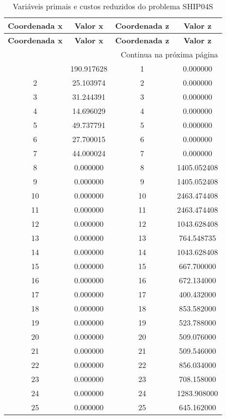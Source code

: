 \documentclass[12pt]{article}
\begin{document}
\begin{longtable}{@{}cccc@{}}
\caption{Variáveis primais e custos reduzidos do problema SHIP04S} \\
\toprule
\textbf{Coordenada x} & \textbf{Valor x} & \textbf{Coordenada z} & \textbf{Valor z} \\
\midrule
\endfirsthead

\toprule
\textbf{Coordenada x} & \textbf{Valor x} & \textbf{Coordenada z} & \textbf{Valor z} \\
\midrule
\endhead

\midrule \multicolumn{4}{r}{{Continua na próxima página}} \\ \midrule
\endfoot

\bottomrule
\endlastfoot
1 & 190.917628 & 1 & 0.000000 \\
2 & 25.103974 & 2 & 0.000000 \\
3 & 31.244391 & 3 & 0.000000 \\
4 & 14.696029 & 4 & 0.000000 \\
5 & 49.737791 & 5 & 0.000000 \\
6 & 27.700015 & 6 & 0.000000 \\
7 & 44.000024 & 7 & 0.000000 \\
8 & 0.000000 & 8 & 1405.052408 \\
9 & 0.000000 & 9 & 1405.052408 \\
10 & 0.000000 & 10 & 2463.474408 \\
11 & 0.000000 & 11 & 2463.474408 \\
12 & 0.000000 & 12 & 1043.628408 \\
13 & 0.000000 & 13 & 764.548735 \\
14 & 0.000000 & 14 & 1043.628408 \\
15 & 0.000000 & 15 & 667.700000 \\
16 & 0.000000 & 16 & 672.134000 \\
17 & 0.000000 & 17 & 400.432000 \\
18 & 0.000000 & 18 & 853.582000 \\
19 & 0.000000 & 19 & 523.788000 \\
20 & 0.000000 & 20 & 509.076000 \\
21 & 0.000000 & 21 & 509.546000 \\
22 & 0.000000 & 22 & 856.034000 \\
23 & 0.000000 & 23 & 708.158000 \\
24 & 0.000000 & 24 & 1283.908000 \\
25 & 0.000000 & 25 & 645.162000 \\

\end{longtable}
\end{document}
